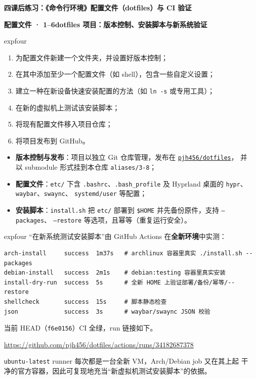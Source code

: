 \documentclass[11pt,a4paper,fontset=none]{ctexart}
\newcommand{\partbanner}[3]{%
  \par\vspace{1.6em}
  \begin{tcolorbox}[enhanced, colback=#1!10, colframe=#1!85!black,
    boxrule=1pt, arc=3pt, left=8pt, right=8pt, top=6pt, bottom=6pt,
    before skip=1.6em]
    {\Large\bfseries\color{#1!70!black}#2\qquad #3}
  \end{tcolorbox}
  \par\vspace{0.2em}\noindent\ignorespaces
}
\newcommand{\hwbanner}[3]{%
  \par\vspace{1.1em}
  \begin{tcolorbox}[enhanced, colback=#1!8, colframe=#1!75!black,
    boxrule=0.8pt, arc=2pt, left=7pt, right=7pt, top=4pt, bottom=4pt,
    before skip=1.1em]
    {\bfseries\color{#1!75!black}#2\qquad #3}
  \end{tcolorbox}
  \par\vspace{0.1em}\noindent\ignorespaces
}
\newcommand{\sublabel}[2]{%
  \par\vspace{0.8em}\noindent{\bfseries\color{#1!75!black}#2}\par\nobreak\vspace{0.25em}\noindent\ignorespaces
}
\begin{document}
\partbanner{expfour}{四}{课后练习：《命令行环境》配置文件（dotfiles）与 CI 验证}

\hwbanner{expfour}{配置文件 · 1--6}{dotfiles 项目：版本控制、安装脚本与新系统验证}
\begin{reqbox}{expfour}
\begin{enumerate}[leftmargin=1.6em, itemsep=1pt]
  \item 为配置文件新建一个文件夹，并设置好版本控制；
  \item 在其中添加至少一个配置文件（如 shell），包含一些自定义设置；
  \item 建立一种在新设备快速安装配置的方法（如 \texttt{ln -s} 或专用工具）；
  \item 在新的虚拟机上测试该安装脚本；
  \item 将现有配置文件移入项目仓库；
  \item 将项目发布到 GitHub。
\end{enumerate}
\end{reqbox}
\sublabel{expfour}{\faCode\ 解答（submodule \texttt{aliases/3-8}）}
\begin{itemize}[leftmargin=1.4em, itemsep=1pt]
  \item \textbf{版本控制与发布}：项目以独立 Git 仓库管理，发布在
        \href{https://github.com/pjh456/dotfiles}{\texttt{pjh456/dotfiles}}，
        并以 submodule 形式挂到本仓库 \texttt{aliases/3-8}；
  \item \textbf{配置文件}：\texttt{etc/} 下含 \texttt{.bashrc}、\texttt{.bash\_profile}
        及 Hyprland 桌面的 \texttt{hypr}、\texttt{waybar}、\texttt{swaync}、
        \texttt{systemd/user} 等配置；
  \item \textbf{安装脚本}：\texttt{install.sh} 把 \texttt{etc/} 部署到
        \texttt{\$HOME} 并先备份原件，支持 \texttt{--packages}、
        \texttt{--restore} 等选项，且幂等（重复运行安全）。
\end{itemize}
\begin{resbox}{expfour}
  “在新系统测试安装脚本”由 GitHub Actions 在\textbf{全新环境}中实测：
  \begin{lstlisting}[style=output]
arch-install     success  1m37s   # archlinux 容器里真实 ./install.sh --packages
debian-install   success  2m1s    # debian:testing 容器里真实安装
install-dry-run  success  5s      # 全新 HOME 上验证部署/备份/幂等/--restore
shellcheck       success  15s     # 脚本静态检查
json             success  3s      # waybar/swaync JSON 校验
\end{lstlisting}
  当前 HEAD（\texttt{f6e0156}）CI 全绿，run 链接如下。
  \begin{center}
  \url{https://github.com/pjh456/dotfiles/actions/runs/34182687378}
  \end{center}
  \texttt{ubuntu-latest} runner 每次都是一台全新 VM，Arch/Debian job 又在其上起
  干净的官方容器，因此可复现地充当“新虚拟机测试安装脚本”的依据。
\end{resbox}
\end{document}
